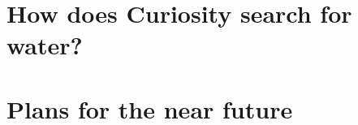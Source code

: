 \documentclass[DIV=calc, paper=a4, fontsize=12pt]{scrartcl}	 %
\begin{document}
\begin{multicols}{2}




\end{multicols}
\pagebreak
\section*{How does Curiosity search for water?}
\begin{multicols}{2}















\end{multicols}

\section*{Plans for the near future}

\begin{multicols}{2}









\end{multicols}
\end{document}
